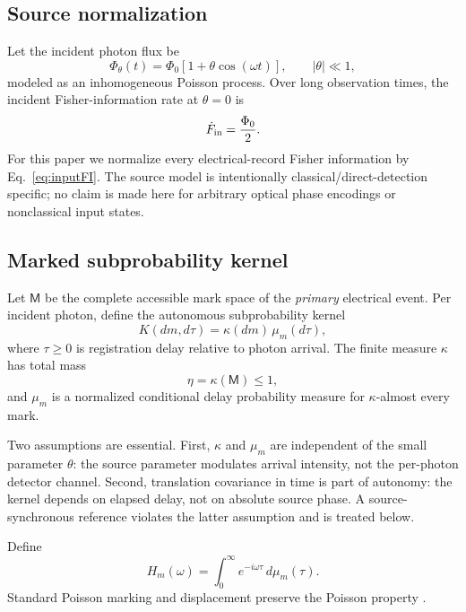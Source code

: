 \documentclass[aps,prapplied,preprint,nofootinbib]{revtex4-2}
\newcommand{\M}{\mathsf M}
\begin{document}
\subsection{Source normalization}

Let the incident photon flux be
\begin{equation}
\Phi_\theta(t)=\Phi_0[1+\theta\cos(\omega t)],\qquad |\theta|\ll1,
\label{eq:source}
\end{equation}
modeled as an inhomogeneous Poisson process. Over long observation times, the incident Fisher-information rate at $\theta=0$ is
\begin{equation}
\dot F_{\rm in}=\frac{\Phi_0}{2}.
\label{eq:inputFI}
\end{equation}
For this paper we normalize every electrical-record Fisher information by Eq.~\eqref{eq:inputFI}. The source model is intentionally classical/direct-detection specific; no claim is made here for arbitrary optical phase encodings or nonclassical input states.

\subsection{Marked subprobability kernel}

Let $\M$ be the complete accessible mark space of the \emph{primary} electrical event. Per incident photon, define the autonomous subprobability kernel
\begin{equation}
K(dm,d\tau)=\kappa(dm)\,\mu_m(d\tau),
\label{eq:kernel}
\end{equation}
where $\tau\ge0$ is registration delay relative to photon arrival. The finite measure $\kappa$ has total mass
\begin{equation}
\eta=\kappa(\M)\le1,
\end{equation}
and $\mu_m$ is a normalized conditional delay probability measure for $\kappa$-almost every mark.

Two assumptions are essential. First, $\kappa$ and $\mu_m$ are independent of the small parameter $\theta$: the source parameter modulates arrival intensity, not the per-photon detector channel. Second, translation covariance in time is part of autonomy: the kernel depends on elapsed delay, not on absolute source phase. A source-synchronous reference violates the latter assumption and is treated below.

Define
\begin{equation}
H_m(\omega)=\int_0^\infty e^{-i\omega\tau}\,d\mu_m(\tau).
\end{equation}
Standard Poisson marking and displacement preserve the Poisson property \cite{Kingman1993,DaleyVereJones2003}.
\end{document}
